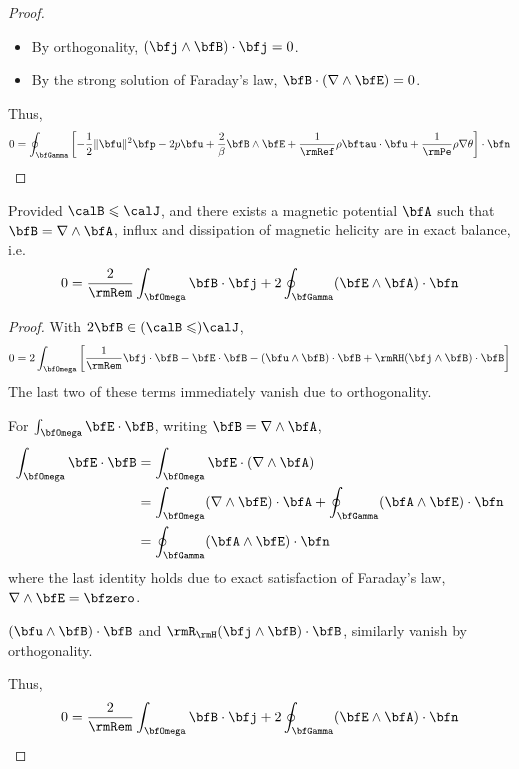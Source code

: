 \begin{proof}
\begin{itemize}
                \item  By orthogonality, $(\bfj\wedge\bfB)\cdot\bfj  =  0$.
                \item  By the strong solution of Faraday's law, $\bfB\cdot(\nabla\wedge\bfE)  =  0$.
            \end{itemize}
            Thus,
            \begin{equation}
                0  =  \oint_{\bfGamma}\left[- \frac{1}{2}\|\bfu\|^{2}\bfp - 2p\bfu + \frac{2}{\beta}\bfB\wedge\bfE + \frac{1}{\rmRef}\rho\bftau\cdot\bfu + \frac{1}{\rmPe}\rho\nabla\theta\right]\cdot\bfn
            \end{equation}
        \end{proof}
        
        \begin{theorem*}
            Provided $\calB  \leqslant  \calJ$, and there exists a magnetic potential $\bfA$ such that $\bfB  =  \nabla\wedge\bfA$, influx and dissipation  of magnetic helicity are in exact balance, i.e.
            \begin{equation}
                0  =  \frac{2}{\rmRem}\int_{\bfOmega}\bfB\cdot\bfj + 2\oint_{\bfGamma}(\bfE\wedge\bfA)\cdot\bfn
            \end{equation}
        \end{theorem*}
        \begin{proof}
            With $2\bfB  \in  (\calB  \leqslant)  \calJ$,
            \begin{align}
                0  =  2\int_{\bfOmega}\left[\frac{1}{\rmRem}\bfj\cdot\bfB - \bfE\cdot\bfB - (\bfu\wedge\bfB)\cdot\bfB + \rmRH(\bfj\wedge\bfB)\cdot\bfB\right]
            \end{align}
            The last two of these terms immediately vanish due to orthogonality.
            
            For $\int_{\bfOmega}\bfE\cdot\bfB$, writing $\bfB  =  \nabla\wedge\bfA$,
            \begin{align}
                \int_{\bfOmega}\bfE\cdot\bfB  &=  \int_{\bfOmega}\bfE\cdot(\nabla\wedge\bfA)  \\
                &=  \int_{\bfOmega}(\nabla\wedge\bfE)\cdot\bfA + \oint_{\bfGamma}(\bfA\wedge\bfE)\cdot\bfn  \\
                &=  \oint_{\bfGamma}(\bfA\wedge\bfE)\cdot\bfn
            \end{align}
            where the last identity holds due to exact satisfaction of Faraday's law, $\nabla\wedge\bfE  =  \bfzero$.

            $(\bfu\wedge\bfB)\cdot\bfB$ and $\rmR_{\rmH}(\bfj\wedge\bfB)\cdot\bfB$, similarly vanish by orthogonality. 
            
            Thus,
            \begin{equation}
                0  =  \frac{2}{\rmRem}\int_{\bfOmega}\bfB\cdot\bfj + 2\oint_{\bfGamma}(\bfE\wedge\bfA)\cdot\bfn
            \end{equation}
        \end{proof}
        
